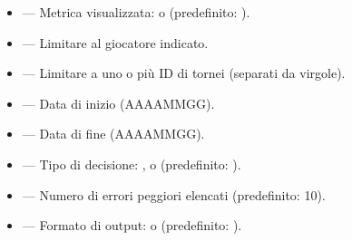 \documentclass[letterpaper,10pt,italian]{sphinxmanual}
\begin{document}
\sphinxAtStartPar
{}
\begin{itemize}
\item {} 
\sphinxAtStartPar
{} — Metrica visualizzata:  o  (predefinito: ).

\item {} 
\sphinxAtStartPar
{} — Limitare al giocatore indicato.

\item {} 
\sphinxAtStartPar
{} — Limitare a uno o più ID di tornei (separati da virgole).

\item {} 
\sphinxAtStartPar
{} — Data di inizio (AAAA\sphinxhyphen{}MM\sphinxhyphen{}GG).

\item {} 
\sphinxAtStartPar
{} — Data di fine (AAAA\sphinxhyphen{}MM\sphinxhyphen{}GG).

\item {} 
\sphinxAtStartPar
{} — Tipo di decisione: ,  o  (predefinito: ).

\item {} 
\sphinxAtStartPar
{} — Numero di errori peggiori elencati (predefinito: 10).

\item {} 
\sphinxAtStartPar
{} — Formato di output:  o  (predefinito: ).

\end{itemize}

\sphinxAtStartPar
{}
\end{document}
